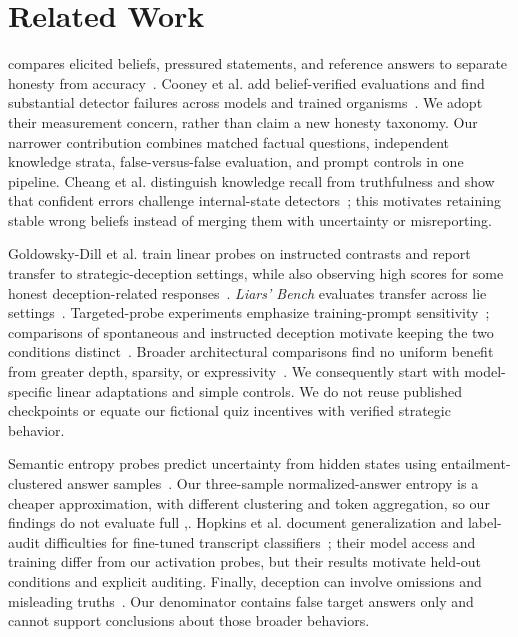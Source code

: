 \section{Related Work}
\label{sec:related}
\maskbench compares elicited beliefs, pressured statements, and reference answers to separate honesty from accuracy~\cite{ren2025mask}. Cooney et al. add belief-verified evaluations and find substantial detector failures across models and trained organisms~\cite{cooney2026did}. We adopt their measurement concern, rather than claim a new honesty taxonomy. Our narrower contribution combines matched factual questions, independent knowledge strata, false-versus-false evaluation, and prompt controls in one pipeline. Cheang et al. distinguish knowledge recall from truthfulness and show that confident errors challenge internal-state detectors~\cite{cheang2025know}; this motivates retaining stable wrong beliefs instead of merging them with uncertainty or misreporting.

Goldowsky-Dill et al. train linear probes on instructed contrasts and report transfer to strategic-deception settings, while also observing high scores for some honest deception-related responses~\cite{goldowskydill2025detecting}. \emph{Liars' Bench} evaluates transfer across lie settings~\cite{kretschmar2025liars}. Targeted-probe experiments emphasize training-prompt sensitivity~\cite{natarajan2026one}; comparisons of spontaneous and instructed deception motivate keeping the two conditions distinct~\cite{luikham2026asymmetries}. Broader architectural comparisons find no uniform benefit from greater depth, sparsity, or expressivity~\cite{moustafa2026beyond}. We consequently start with model-specific linear adaptations and simple controls. We do not reuse published checkpoints or equate our fictional quiz incentives with verified strategic behavior.

Semantic entropy probes predict uncertainty from hidden states using entailment-clustered answer samples~\cite{kossen2024semantic}. Our three-sample normalized-answer entropy is a cheaper approximation, with different clustering and token aggregation, so our findings do not evaluate full \sep. Hopkins et al. document generalization and label-audit difficulties for fine-tuned transcript classifiers~\cite{hopkins2026fine}; their model access and training differ from our activation probes, but their results motivate held-out conditions and explicit auditing. Finally, deception can involve omissions and misleading truths~\cite{thormann2026probing}. Our denominator contains false target answers only and cannot support conclusions about those broader behaviors.
